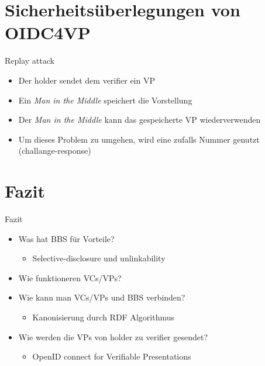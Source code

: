 \documentclass[
	german,%
	authorontitle=true,
	]{bfhbeamer}
\begin{document}
\section{Sicherheitsüberlegungen von OIDC4VP}

\begin{frame}{Replay attack}
    \begin{itemize}
        \item Der holder sendet dem verifier ein VP
        \item Ein \textit{Man in the Middle} speichert die Vorstellung
        \item Der \textit{Man in the Middle} kann das gespeicherte VP wiederverwenden
        \item Um dieses Problem zu umgehen, wird eine zufalls Nummer genutzt (challange-response)
    \end{itemize}
\end{frame}


\section{Fazit}

\begin{frame}{Fazit}
    \begin{itemize}
        \item Was hat BBS für Vorteile?
        \begin{itemize}
            \item Selective-disclosure und unlinkability
        \end{itemize}
        \item Wie funktioneren VCs/VPs?
        \item Wie kann man VCs/VPs und BBS verbinden?
        \begin{itemize}
            \item Kanonisierung durch RDF Algorithmus
        \end{itemize}
        \item Wie werden die VPs von holder zu verifier gesendet?
        \begin{itemize}
            \item OpenID connect for Verifiable Presentations
        \end{itemize}
    \end{itemize}
\end{frame}
\end{document}

